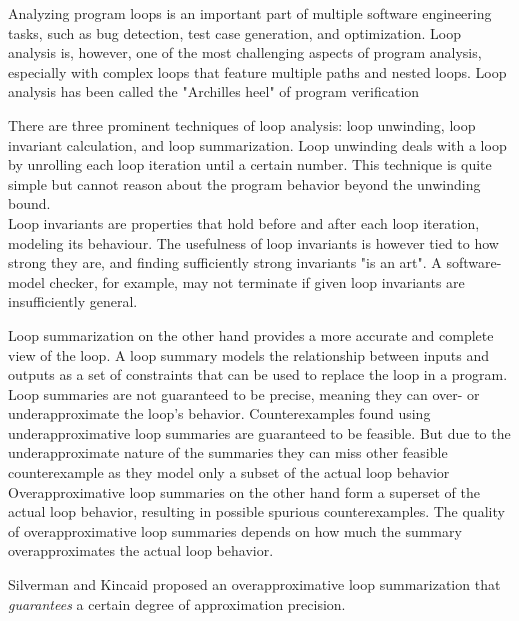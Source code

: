 
Analyzing program loops is an important part of multiple software engineering tasks, such as bug detection, test case generation, and optimization. Loop analysis is, however, one of the most challenging aspects of program analysis, especially with complex loops that feature multiple paths and nested loops. Loop analysis has been called the "Archilles heel" of program verification\cite{DBLP:journals/fmsd/KroeningSTTW13} \par
There are three prominent techniques of loop analysis: loop unwinding, loop invariant calculation, and loop summarization\cite{DBLP:journals/fmsd/KroeningSTTW13 , DBLP:conf/cav/SilvermanK19, DBLP:journals/tse/XieCZLLL19}. Loop unwinding deals with a loop by unrolling each loop iteration until a certain number. This technique is quite simple but cannot reason about the program behavior beyond the unwinding bound. \\
Loop invariants are properties that hold before and after each loop iteration, modeling its behaviour. The usefulness of loop invariants is however tied to how strong they are, and finding sufficiently strong invariants "is an art"\cite{DBLP:journals/fmsd/KroeningSTTW13}. A software-model checker, for example, may not terminate if given loop invariants are insufficiently general. \par
Loop summarization on the other hand provides a more accurate and complete view of the loop. A loop summary models the relationship between inputs and outputs as a set of constraints that can be used to replace the loop in a program. Loop summaries are not guaranteed to be precise, meaning they can over- or underapproximate the loop's behavior. Counterexamples found using underapproximative loop summaries are guaranteed to be feasible. But due to the underapproximate nature of the summaries they can miss other feasible counterexample as they model only a subset of the actual loop behavior \cite{DBLP:journals/fmsd/KroeningLW15} Overapproximative loop summaries on the other hand form a superset of the actual loop behavior, resulting in possible spurious counterexamples. The quality of overapproximative loop summaries depends on how much the summary overapproximates the actual loop behavior.\\ \par
Silverman and Kincaid\cite{DBLP:conf/cav/SilvermanK19} proposed an overapproximative loop summarization that \textsl{guarantees} a certain degree of approximation precision.\par 

